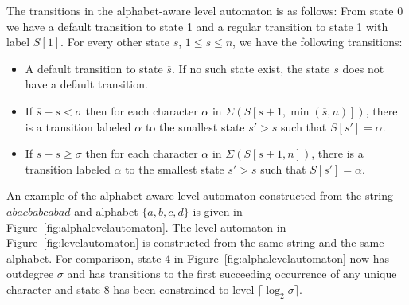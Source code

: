 \documentclass[a4paper,11pt]{article}
\begin{document}
The transitions in the alphabet-aware level automaton is as follows:
From state 0 we have a default transition to state 1 and a regular transition to state 1 with label $S[1]$.
For every other state $s$, $1 \leq s \leq n$, we have the following transitions:
\begin{itemize}
\item A default transition to state $\overline{s}$. If no such state exist, the state $s$ does not have a default transition.
\item If $\overline{s} - s < \sigma$ then for each character $\alpha$ in $\Sigma(S[s + 1, \min(\overline{s}, n)])$, there is a transition labeled $\alpha$ to the smallest state $s' > s$ such that $S[s']= \alpha$.
\item If $\overline{s} - s \geq \sigma$ then for each character $\alpha$ in $\Sigma(S[s + 1,  n])$, there is a transition labeled $\alpha$ to the smallest state $s' > s$ such that $S[s']= \alpha$.
\end{itemize}

An example of the alphabet-aware level automaton constructed from the string $abacbabcabad$ and alphabet $\{a,b,c,d\}$ is given in Figure~\ref{fig:alphalevelautomaton}. The level automaton in Figure~\ref{fig:levelautomaton} is constructed from the same string and the same alphabet. For comparison, state 4 in Figure~\ref{fig:alphalevelautomaton} now has outdegree $\sigma$ and has transitions to the first succeeding occurrence of any unique character and state 8 has been constrained to level $\lceil \log_2 \sigma \rceil$.
\end{document}
